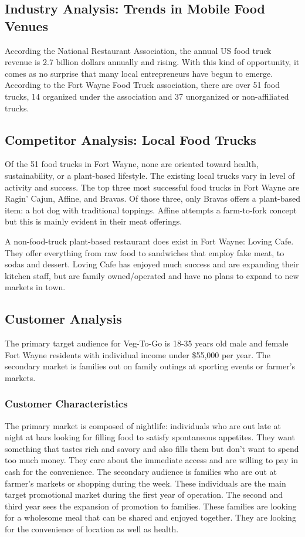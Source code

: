 \documentclass[12pt, letterpaper]{article}
\begin{document}
\subsection{Industry Analysis: Trends in Mobile Food Venues}
According the National Restaurant Association, the annual US food truck revenue is 2.7 billion dollars annually and rising. \cite{ibis1} With this kind of opportunity, it comes as no surprise
that many local entrepreneurs have begun to emerge. According to the Fort Wayne Food Truck association, there are over 51 food trucks, 14 organized under the association and 37 unorganized or non-affiliated trucks. \cite{fwfta}

\subsection{Competitor Analysis: Local Food Trucks}
Of the 51 food trucks in Fort Wayne, none are oriented toward health, sustainability, or a plant-based lifestyle. \cite{fwfta2} The existing local trucks vary in level of activity and success.  The top three most successful food trucks in Fort Wayne are Ragin' Cajun, Affine, and Bravas. \cite{fwfta2} Of those three, only Bravas offers a plant-based item: a hot dog with traditional toppings.  Affine attempts a farm-to-fork concept but this is mainly evident in their meat offerings.

A non-food-truck plant-based restaurant does exist in Fort Wayne: Loving Cafe. They offer everything from raw food to sandwiches that employ fake meat, to sodas and dessert.  Loving Cafe has enjoyed much success and are expanding their kitchen staff, but are family owned/operated and have no plans to expand to new markets in town.

\subsection{Customer Analysis}
The primary target audience for Veg-To-Go is 18-35 years old male and female Fort Wayne residents with individual income under \$55,000 per year.  The secondary market is families out on family outings at sporting events or farmer's markets.
\subsubsection{Customer Characteristics}
The primary market is composed of nightlife: individuals who are out late at night at bars looking for filling food to satisfy spontaneous appetites. They want something that tastes rich and savory and also fills them but don't want to spend too much money. They care about the immediate access and are willing to pay in cash for the convenience. The secondary audience is families who are out at farmer's markets or shopping during the week.  These individuals are the main target promotional market during the first year of operation.
The second and third year sees the expansion of promotion to families.  These families are looking for a wholesome meal that can be shared and enjoyed together. They are looking for the convenience of location as well as health.
\end{document}
